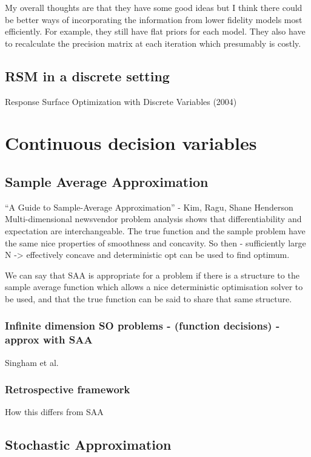 \message{ !name(SO-Methods.tex)}\documentclass{article}
\begin{document}
My overall thoughts are that they have some good ideas but I think there could be better ways of incorporating the information from lower fidelity models most efficiently. For example, they still have flat priors for each model. They also have to recalculate the precision matrix at each iteration which presumably is costly. 

\subsection{RSM in a discrete setting}

Response Surface Optimization with Discrete Variables (2004)

\section{Continuous decision variables}

\subsection{Sample Average Approximation}

``A Guide to Sample-Average Approximation'' - Kim, Ragu, Shane Henderson
Multi-dimensional newsvendor problem analysis shows that differentiability and expectation are interchangeable. The true function and the sample problem have the same nice properties of smoothness and concavity. So then - sufficiently large N -> effectively concave and deterministic opt can be used to find optimum.

We can say that SAA is appropriate for a problem if there is a structure to the sample average function which allows a nice deterministic optimisation solver to be used, and that the true function can be said to share that same structure.

\subsubsection{Infinite dimension SO problems - (function decisions) - approx with SAA}

Singham et al. 

\subsubsection{Retrospective framework}

How this differs from SAA

\subsection{Stochastic Approximation}
\end{document}
